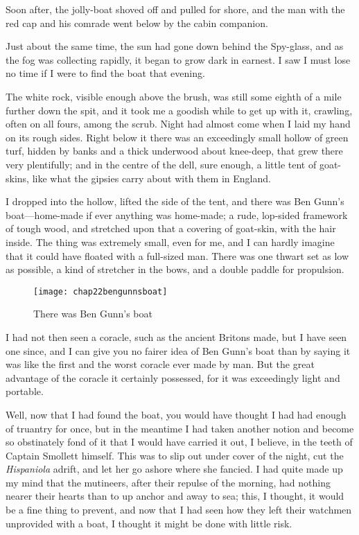 Soon after, the jolly-boat shoved off and pulled for shore, and the man with the red cap and his comrade went below by the cabin companion.

Just about the same time, the sun had gone down behind the Spy-glass, and as the fog was collecting rapidly, it began to grow dark in earnest. I saw I must lose no time if I were to find the boat that evening.

The white rock, visible enough above the brush, was still some eighth of a mile further down the spit, and it took me a goodish while to get up with it, crawling, often on all fours, among the scrub. Night had almost come when I laid my hand on its rough sides. Right below it there was an exceedingly small hollow of green turf, hidden by banks and a thick underwood about knee-deep, that grew there very plentifully; and in the centre of the dell, sure enough, a little tent of goat-skins, like what the gipsies carry about with them in England.

I dropped into the hollow, lifted the side of the tent, and there was Ben Gunn’s boat---home-made if ever anything was home-made; a rude, lop-sided framework of tough wood, and stretched upon that a covering of goat-skin, with the hair inside. The thing was extremely small, even for me, and I can hardly imagine that it could have floated with a full-sized man. There was one thwart set as low as possible, a kind of stretcher in the bows, and a double paddle for propulsion.

  \begin{sidewaysfigure}
\texttt{[image: chap22bengunnsboat]}%
\caption{There was Ben Gunn’s boat}
\end{sidewaysfigure} 
 

I had not then seen a coracle, such as the ancient Britons made, but I have seen one since, and I can give you no fairer idea of Ben Gunn’s boat than by saying it was like the first and the worst coracle ever made by man. But the great advantage of the coracle it certainly possessed, for it was exceedingly light and portable.

Well, now that I had found the boat, you would have thought I had had enough of truantry for once, but in the meantime I had taken another notion and become so obstinately fond of it that I would have carried it out, I believe, in the teeth of Captain Smollett himself. This was to slip out under cover of the night, cut the \textit{Hispaniola} adrift, and let her go ashore where she fancied. I had quite made up my mind that the mutineers, after their repulse of the morning, had nothing nearer their hearts than to up anchor and away to sea; this, I thought, it would be a fine thing to prevent, and now that I had seen how they left their watchmen unprovided with a boat, I thought it might be done with little risk.

